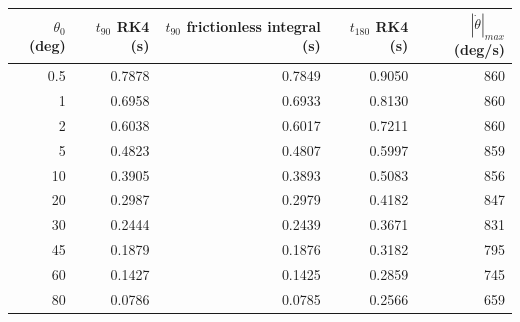 \begin{tabular}{rrrrr}
\toprule
$\theta_0$ (deg) & $t_{90}$ RK4 (s) & $t_{90}$ frictionless integral (s) & $t_{180}$ RK4 (s) & $|\dot\theta|_{max}$ (deg/s)\\
\midrule
0.5 & 0.7878 & 0.7849 & 0.9050 & 860 \\
1 & 0.6958 & 0.6933 & 0.8130 & 860 \\
2 & 0.6038 & 0.6017 & 0.7211 & 860 \\
5 & 0.4823 & 0.4807 & 0.5997 & 859 \\
10 & 0.3905 & 0.3893 & 0.5083 & 856 \\
20 & 0.2987 & 0.2979 & 0.4182 & 847 \\
30 & 0.2444 & 0.2439 & 0.3671 & 831 \\
45 & 0.1879 & 0.1876 & 0.3182 & 795 \\
60 & 0.1427 & 0.1425 & 0.2859 & 745 \\
80 & 0.0786 & 0.0785 & 0.2566 & 659 \\
\bottomrule
\end{tabular}

